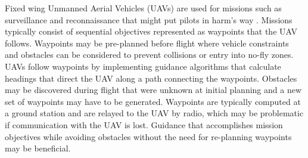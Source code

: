\documentclass[numbered,pdftex]{ohio-etd}
\begin{document}
Fixed wing Unmanned Aerial Vehicles (UAVs) are used for missions such as surveillance and reconnaissance that might put pilots in harm’s way \cite{bone_uavs_2003}. Missions typically consist of sequential objectives represented as waypoints that the UAV follows. Waypoints may be pre-planned before flight where vehicle constraints and obstacles can be considered to prevent collisions or entry into no-fly zones. UAVs follow waypoints by implementing guidance algorithms that calculate headings that direct the UAV along a path connecting the waypoints. Obstacles may be discovered during flight that were unknown at initial planning and a new set of waypoints may have to be generated.  Waypoints are typically computed at a ground station and are relayed to the UAV by radio, which may be problematic if communication with the UAV is lost. Guidance that accomplishes mission objectives while avoiding obstacles without the need for re-planning waypoints may be beneficial. 
\end{document}
